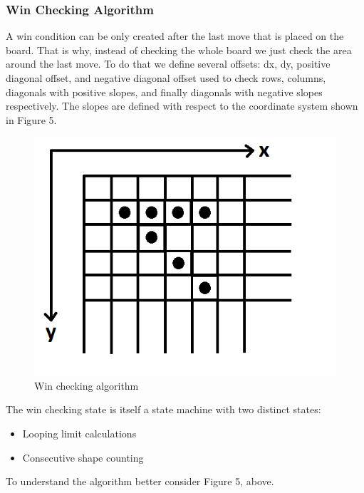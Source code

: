 \documentclass[conference]{IEEEtran}
\begin{document}
\subsubsection{Win Checking Algorithm} 
A win condition can be only created after the last move that is placed on the board. That is why, instead of checking the whole board we just check the area around the last move. To do that we define several offsets: dx, dy, positive diagonal offset, and negative diagonal offset used to check rows, columns, diagonals with positive slopes, and finally diagonals with negative slopes respectively. The slopes are defined with respect to the coordinate system shown in Figure 5.
 \begin{figure}[H]
   \centerline{\includegraphics[scale=0.6]{check.png}}
    \caption{Win checking algorithm}
\end{figure} 
The win checking state is itself a state machine with two distinct states: 
\begin{itemize}
\item Looping limit calculations
\item Consecutive shape counting
\end{itemize}
To understand the algorithm better consider Figure 5, above. \\
\end{document}
